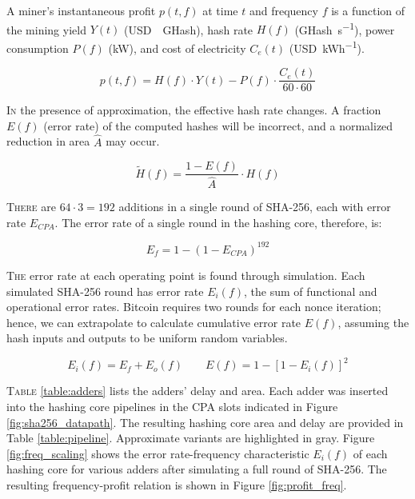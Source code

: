 \documentclass[portrait,a0,final]{a0poster}
\begin{document}
\begin{multicols}{3}
\begin{tcolorbox}[title=Approximate Mining]
\lettrine{A}{} miner's instantaneous profit $p(t,f)$ at time $t$ and frequency $f$ is a function of the mining yield $Y(t)$ (\si{USD \per GHash}), hash rate $H(f)$ (\si{GHash\per\second}), power consumption $P(f)$ (\si{\kilo\watt}), and cost of electricity $C_e(t)$ (\si{USD\per\kWh}).

\begin{equation}
\label{eq:profit}
p(t,f) = H(f) \cdot Y(t) - P(f) \cdot \frac{C_e(t)}{60 \cdot 60}
\end{equation}

\lettrine{I}{n} the presence of approximation, the effective hash rate changes. A fraction $E(f)$ (error rate) of the computed hashes will be incorrect, and a normalized reduction in area $\hat{A}$ may occur.

\begin{equation}
\label{eq:hash_rate}
\tilde{H}(f) = \frac{1 - E(f)}{\hat{A}} \cdot H(f)
\end{equation}

\lettrine{T}{here} are $64 \cdot 3 = 192$ additions in a single round of SHA-256, each with error rate $E_{CPA}$. The error rate of a single round in the hashing core, therefore, is:

\begin{equation}
\label{eq:error_func}
E_f = 1 - (1 - E_{CPA})^{192}
\end{equation}

\lettrine{T}{he} error rate at each operating point is found through simulation. Each simulated SHA-256 round has error rate $E_i(f)$, the sum of functional and operational error rates. Bitcoin requires two rounds for each nonce iteration; hence, we can extrapolate to calculate cumulative error rate $E(f)$, assuming the hash inputs and outputs to be uniform random variables.

\begin{equation}
E_i(f) = E_f + E_o(f) \qquad E(f) = 1 - [1 - E_i(f)]^2
\end{equation}
\end{tcolorbox}

\begin{tcolorbox}[title=Results]
\lettrine{T}{able} \ref{table:adders} lists the adders' delay and area. Each adder was inserted into the hashing core pipelines in the CPA slots indicated in Figure \ref{fig:sha256_datapath}. The resulting hashing core area and delay are provided in Table \ref{table:pipeline}. Approximate variants are highlighted in gray. Figure \ref{fig:freq_scaling} shows the error rate-frequency characteristic $E_i(f)$ of each hashing core for various adders after simulating a full round of SHA-256. The resulting frequency-profit relation is shown in Figure \ref{fig:profit_freq}.
\end{tcolorbox}


\end{multicols}
\end{document}
